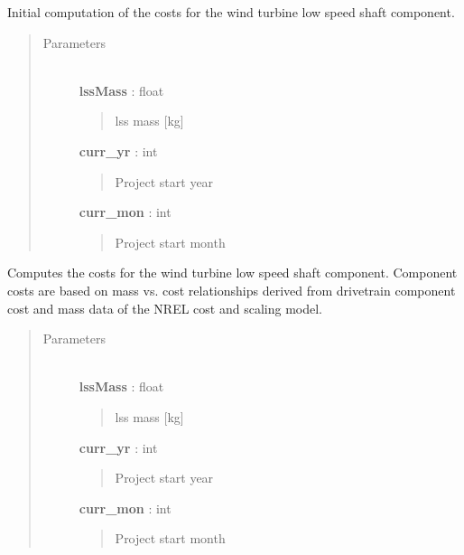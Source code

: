 \documentclass[letterpaper,10pt,openany,oneside]{sphinxmanual}
\begin{document}
\begin{fulllineitems}
\label{documentation:turbine_costSE.src.nacelle_costsSE.LowSpeedShaftCost}
Initial computation of the costs for the wind turbine low speed shaft component.
\begin{quote}\begin{description}
\item[{Parameters }] \leavevmode\\
\textbf{lssMass} : float
\begin{quote}

lss mass {[}kg{]}
\end{quote}

\textbf{curr\_yr} : int
\begin{quote}

Project start year
\end{quote}

\textbf{curr\_mon} : int
\begin{quote}

Project start month
\end{quote}

\end{description}\end{quote}

\begin{fulllineitems}
\label{documentation:turbine_costSE.src.nacelle_costsSE.LowSpeedShaftCost.update_cost}
Computes the costs for the wind turbine low speed shaft component.
Component costs are based on mass vs. cost relationships derived from drivetrain component cost and mass data of the NREL cost and scaling model.
\begin{quote}\begin{description}
\item[{Parameters }] \leavevmode\\
\textbf{lssMass} : float
\begin{quote}

lss mass {[}kg{]}
\end{quote}

\textbf{curr\_yr} : int
\begin{quote}

Project start year
\end{quote}

\textbf{curr\_mon} : int
\begin{quote}

Project start month
\end{quote}

\end{description}\end{quote}

\end{fulllineitems}


\end{fulllineitems}
\end{document}
